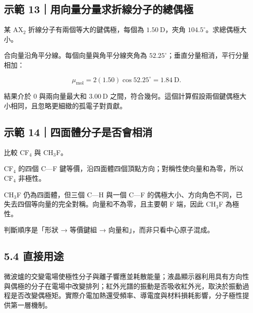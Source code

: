 \documentclass[11pt,a4paper]{article}
\begin{document}
\begin{HandoutWorkedExample}

\subsection{示範 13｜用向量分量求折線分子的總偶極}\label{ux793aux7bc4-13ux7528ux5411ux91cfux5206ux91cfux6c42ux6298ux7ddaux5206ux5b50ux7684ux7e3dux5076ux6975}

某 AX\(_2\) 折線分子有兩個等大的鍵偶極，每個為 \(1.50\ \mathrm D\)，夾角 \(104.5^\circ\)。求總偶極大小。

合向量沿角平分線。每個向量與角平分線夾角為 \(52.25^\circ\)；垂直分量相消，平行分量相加：

\[
\mu_{\mathrm{mol}}
=2(1.50)\cos52.25^\circ
=1.84\ \mathrm D.
\]

結果介於 \(0\) 與兩向量最大和 \(3.00\ \mathrm D\) 之間，符合幾何。這個計算假設兩個鍵偶極大小相同，且忽略更細緻的孤電子對貢獻。

\end{HandoutWorkedExample}

\begin{HandoutWorkedExample}

\subsection{示範 14｜四面體分子是否會相消}\label{ux793aux7bc4-14ux56dbux9762ux9ad4ux5206ux5b50ux662fux5426ux6703ux76f8ux6d88}

比較 CF\(_4\) 與 CH\(_3\)F。

CF\(_4\) 的四個 C---F 鍵等價，沿四面體四個頂點方向；對稱性使向量和為零，所以 CF\(_4\) 非極性。

CH\(_3\)F 仍為四面體，但三個 C---H 與一個 C---F 的偶極大小、方向角色不同，已失去四個等向量的完全對稱。向量和不為零，且主要朝 F 端，因此 CH\(_3\)F 為極性。

判斷順序是「形狀 → 等價鍵組 → 向量和」，而非只看中心原子混成。

\end{HandoutWorkedExample}

\subsection{5.4 直接用途}\label{ux76f4ux63a5ux7528ux9014-2}

微波爐的交變電場使極性分子與離子響應並耗散能量；液晶顯示器利用具有方向性與偶極的分子在電場中改變排列；紅外光譜的振動是否吸收紅外光，取決於振動過程是否改變偶極矩。實際介電加熱還受頻率、導電度與材料損耗影響，分子極性提供第一層機制。
\end{document}
